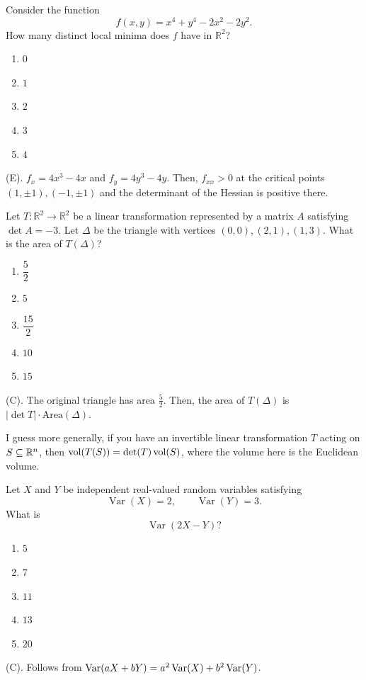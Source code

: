\begin{exercise}
Consider the function
\[
f(x,y)=x^4+y^4-2x^2-2y^2.
\]
How many distinct local minima does
$f$ have in $\mathbb R^2$?
\begin{enumerate}[label=(\Alph*)]
    \item $0$
    \item $1$
    \item $2$
    \item $3$
    \item $4$
\end{enumerate}
\end{exercise}
\begin{solution}
(E). $f_x = 4x^3 - 4x$ and $f_y = 4y^3 - 4y$.
Then, $f_{xx} > 0$ at the critical points $(1,\pm 1), (-1, \pm 1)$ and the determinant of the Hessian is positive there.
\end{solution}


\begin{exercise}
Let $T:\mathbb R^2\to\mathbb R^2$ be a
linear transformation represented by
a matrix $A$ satisfying $\det A=-3$. Let $\Delta$ be the triangle with vertices
$(0,0), (2,1), (1,3)$. What is the area of $T(\Delta)$?
\begin{enumerate}[label=(\Alph*)]
    \item $\dfrac52$
    \item $5$
    \item $\dfrac{15}{2}$
    \item $10$
    \item $15$
\end{enumerate}
\end{exercise}
\begin{solution}
(C). The original triangle has area $\frac{5}{2}$. Then, the area of $T(\Delta)$ 
is $|\det T| \cdot \text{Area}(\Delta)$.
\end{solution}

\begin{remark}
I guess more generally, if you have an invertible linear transformation $T$ acting on 
$S \subseteq \mathbb{R}^n$, then $\operatorname{vol}(T(S)) = \det(T) \operatorname{vol}(S)$, where the volume here is the 
Euclidean volume.
\end{remark}

\begin{exercise}
Let $X$ and $Y$ be independent
real-valued random variables satisfying
\[
\operatorname{Var}(X)=2,
\qquad
\operatorname{Var}(Y)=3.
\]
What is
\[
\operatorname{Var}(2X-Y)?
\]
\begin{enumerate}[label=(\Alph*)]
    \item $5$
    \item $7$
    \item $11$
    \item $13$
    \item $20$
\end{enumerate}
\end{exercise}
\begin{solution} 
(C). Follows from $\operatorname{Var}(aX + bY) = a^2\operatorname{Var}(X) + b^2\operatorname{Var}(Y)$.
\end{solution}

